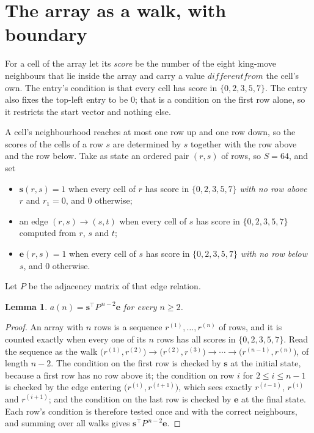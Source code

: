 \documentclass[11pt,a4paper]{article}
\theoremstyle{plain}
\newtheorem{lemma}[theorem]{Lemma}
\theoremstyle{definition}
\begin{document}
\section{The array as a walk, with boundary}

For a cell of the array let its \emph{score} be the number of the eight king-move neighbours that lie inside
the array and carry a value $different from$ the cell's own. The entry's condition is that every cell
has score in $\{0,2,3,5,7\}$. The entry also fixes the top-left entry to be $0$; that is a condition on the first row alone, so it restricts the start vector and nothing else.

A cell's neighbourhood reaches at most one row up and one row down, so the scores of the
cells of a row $s$ are determined by $s$ together with the row above and the row below.
Take as state an ordered pair $(r,s)$ of rows, so $S=64$, and set
\begin{itemize}
\item $\mathbf{s}(r,s)=1$ when every cell of $r$ has score in $\{0,2,3,5,7\}$ \emph{with no row
above $r$} and $r_1=0$, and $0$ otherwise;
\item an edge $(r,s)\to(s,t)$ when every cell of $s$ has score in $\{0,2,3,5,7\}$ computed from
$r$, $s$ and $t$;
\item $\mathbf{e}(r,s)=1$ when every cell of $s$ has score in $\{0,2,3,5,7\}$ \emph{with no row
below $s$}, and $0$ otherwise.
\end{itemize}
Let $P$ be the adjacency matrix of that edge relation.

\begin{lemma}\label{lem:walk}
$a(n)=\mathbf{s}^{\!\top}P^{\,n-2}\mathbf{e}$ for every $n\ge2$.
\end{lemma}

\begin{proof}
An array with $n$ rows is a sequence $r^{(1)},\dots,r^{(n)}$ of rows, and it is counted
exactly when every one of its $n$ rows has all scores in $\{0,2,3,5,7\}$. Read the sequence as the
walk $\bigl(r^{(1)},r^{(2)}\bigr)\to\bigl(r^{(2)},r^{(3)}\bigr)\to\cdots\to
\bigl(r^{(n-1)},r^{(n)}\bigr)$, of length $n-2$. The condition on the first row is
checked by $\mathbf{s}$ at the initial state, because a first row has no row above it; the
condition on row $i$ for $2\le i\le n-1$ is checked by the edge entering
$\bigl(r^{(i)},r^{(i+1)}\bigr)$, which sees exactly $r^{(i-1)}$, $r^{(i)}$ and
$r^{(i+1)}$; and the condition on the last row is checked by $\mathbf{e}$ at the final
state. Each row's condition is therefore tested once and with the correct neighbours, and
summing over all walks gives $\mathbf{s}^{\!\top}P^{\,n-2}\mathbf{e}$.
\end{proof}
\end{document}
